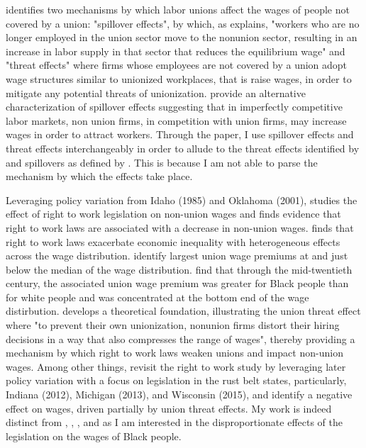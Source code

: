 \documentclass[11pt]{article}
\begin{document}
\citet{lewis1963} identifies two mechanisms by which labor unions affect the wages of people not covered by a union: "spillover effects", by which, as \citet{farber2005} explains, "workers who are no longer employed in the union sector move to the nonunion sector, resulting in an increase in labor supply in that sector that reduces the equilibrium wage" and "threat effects" where firms whose employees are not covered by a union adopt wage structures similar to unionized workplaces, that is raise wages, in order to mitigate any potential threats of unionization. \citet{fll2021} provide an alternative characterization of spillover effects suggesting that in imperfectly competitive labor markets, non union firms, in competition with union firms, may increase wages in order to attract workers. Through the paper, I use spillover effects and threat effects interchangeably in order to allude to the threat effects identified by \citet{lewis1963} and spillovers as defined by \citet{fll2021}. This is because I am not able to parse the mechanism by which the effects take place. 

Leveraging policy variation from Idaho (1985) and Oklahoma (2001), \citet{farber2005} studies the effect of right to work legislation on non-union wages and finds evidence that right to work laws are associated with a decrease in non-union wages. \citet{vanheuvelen2020} finds that right to work laws exacerbate economic inequality with heterogeneous effects across the wage distribution. \citet{ffl2009} identify largest union wage premiums at and just below the median of the wage distribution. \citet{callawaycollins2018} find that through the mid-twentieth century, the associated union wage premium was greater for Black people than for white people and was concentrated at the bottom end of the wage distirbution. \citet{taschereau-dumouchel2020} develops a theoretical foundation, illustrating the union threat effect where "to prevent their own unionization, nonunion firms distort their hiring decisions in a way that also compresses the range of wages", thereby providing a mechanism by which right to work laws weaken unions and impact non-union wages. Among other things, \citet{fll2018} revisit the right to work study by \citet{farber2005} leveraging later policy variation with a focus on legislation in the rust belt states, particularly, Indiana (2012), Michigan (2013), and Wisconsin (2015), and identify a negative effect on wages, driven partially by union threat effects. My work is indeed distinct from \citet{farber2005}, \citet{vanheuvelen2020}, \citet{taschereau-dumouchel2020}, and \citet{fll2018} as I am interested in the disproportionate effects of the legislation on the wages of Black people.
\end{document}
